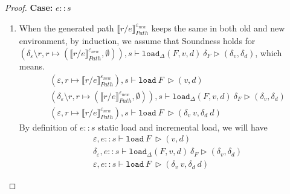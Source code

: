 \documentclass[10pt,twoside,a4paper]{article}
\theoremstyle{theorem}
\theoremstyle{lemma}
\theoremstyle{property}
\theoremstyle{definition}
\theoremstyle{assumption}
\begin{document}
\begin{proof}
	\textbf{Case: } $e::s$\\
	\begin{enumerate}
	\item 
	When the generated path $\llbracket r/e \rrbracket^{\varepsilon_{new}}_{Path}$ keeps the same in both old and new environment, by induction, we assume that Soundness holds for $(\delta_\varepsilon \setminus r, r \mapsto (\llbracket r/e \rrbracket^{\varepsilon_{new}}_{Path}, \emptyset)) , s \vdash \mathtt{load}_\Delta (F,v,d)~ \delta_F \rhd (\delta_v,\delta_d)$, which means.
	\begin{align*}
			& (\varepsilon, r \mapsto \llbracket r/e \rrbracket^{\varepsilon_{new}}_{Path}), s \vdash \mathtt{load}~ F~ \rhd (v,d)\\
			& (\delta_\varepsilon \setminus r, r \mapsto (\llbracket r/e \rrbracket^{\varepsilon_{new}}_{Path}, \emptyset)) , s \vdash \mathtt{load}_\Delta (F,v,d)~ \delta_F \rhd (\delta_v,\delta_d)\\
			& (\varepsilon, r \mapsto \llbracket r/e \rrbracket^{\varepsilon_{new}}_{Path}), s \vdash \mathtt{load}~ F~ \rhd (\delta_v~v,\delta_d~d)
	\end{align*}
	By definition of $e::s$ static load and incremental load, we will have
	\begin{align*}
			& \varepsilon, e::s \vdash \mathtt{load}~ F~ \rhd (v,d)\\
			& \delta_\varepsilon, e::s \vdash \mathtt{load}_\Delta (F,v,d)~ \delta_F \rhd (\delta_v,\delta_d)\\
			& \varepsilon, e::s \vdash \mathtt{load}~ F~ \rhd (\delta_v~v,\delta_d~d)
	\end{align*}


\end{enumerate}
\end{proof}
\end{document}
